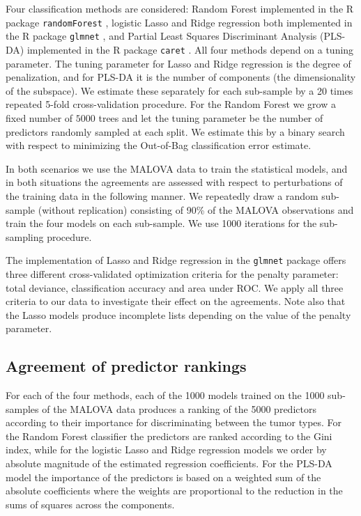 \documentclass[oupdraft]{bio}
\begin{document}
Four classification methods are considered: Random Forest
\citep{breiman2001random} implemented in the R package
\texttt{randomForest} \citep{liaw2002classification}, logistic Lasso
\citep{tibshirani1996regression} and Ridge regression
\citep{segerstedt1992ordinary} both implemented in the R package
\texttt{glmnet} \citep{friedman2010regularization}, and Partial Least
Squares Discriminant Analysis (PLS-DA) \citep{boulesteix2004pls}
implemented in the R package \texttt{caret} \citep{Jed-Wing:2014aa}.
%
All four methods depend on a tuning parameter. The tuning parameter for
Lasso and Ridge regression is the degree of penalization, and for PLS-DA
it is the number of components (the dimensionality of the subspace).
We estimate these separately for each sub-sample by a 20 times repeated
5-fold cross-validation procedure. For the Random Forest we grow a fixed
number of $5000$ trees and let the tuning parameter be the number of
predictors randomly sampled at each split. We estimate this by a binary
search with respect to minimizing the Out-of-Bag classification error estimate.


In both scenarios we use the MALOVA data to train the statistical
models, and in both situations the agreements are assessed with
respect to perturbations of the training data in the following
manner. We repeatedly draw a random sub-sample (without replication)
consisting of 90\% of the MALOVA observations and train the four
models on each sub-sample. We use 1000 iterations for the sub-sampling
procedure.


The implementation of Lasso and Ridge regression in the
\texttt{glmnet} package offers three different cross-validated
optimization criteria for the penalty parameter: total deviance,
classification accuracy and area under ROC. We apply all three
criteria to our data to investigate their effect on the agreements.
Note also that the Lasso models produce incomplete lists depending on
the value of the penalty parameter.


\subsection{Agreement of predictor rankings}
For each of the four methods, each of the 1000 models trained on
the 1000 sub-samples of the MALOVA data produces a ranking of the 5000
predictors according to their importance for discriminating between
the tumor types. For the Random Forest classifier the predictors are ranked according
to the Gini index, while for the logistic Lasso and Ridge regression
models we order by absolute magnitude of the estimated
regression coefficients. For the PLS-DA model the importance of the
predictors is based on a weighted sum of the absolute coefficients
where the weights are proportional to the reduction in the sums of
squares across the components.
\end{document}
